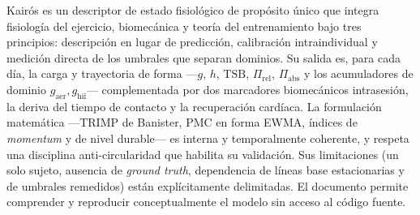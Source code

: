 \documentclass[11pt,a4paper]{article}
\begin{document}
Kairós es un descriptor de estado fisiológico de propósito único que integra fisiología del ejercicio, biomecánica y teoría del entrenamiento bajo tres principios: descripción en lugar de predicción, calibración intraindividual y medición directa de los umbrales que separan dominios. Su salida es, para cada día, la carga y trayectoria de forma —$g$, $h$, $\mathrm{TSB}$, $\Pi_{\mathrm{rel}}$, $\Pi_{\mathrm{abs}}$ y los acumuladores de dominio $g_{\mathrm{aer}}, g_{\mathrm{hii}}$— complementada por dos marcadores biomecánicos intrasesión, la deriva del tiempo de contacto y la recuperación cardíaca. La formulación matemática —TRIMP de Banister, PMC en forma EWMA, índices de \emph{momentum} y de nivel durable— es interna y temporalmente coherente, y respeta una disciplina anti-circularidad que habilita su validación. Sus limitaciones (un solo sujeto, ausencia de \emph{ground truth}, dependencia de líneas base estacionarias y de umbrales remedidos) están explícitamente delimitadas. El documento permite comprender y reproducir conceptualmente el modelo sin acceso al código fuente.
\end{document}
